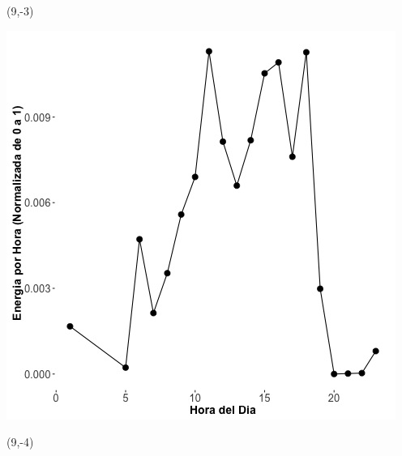 \documentclass{article}\usepackage[]{graphicx}\usepackage[]{color}
\newenvironment{knitrout}{}{} %
\begin{document}
 \begin{textblock}{1}(9,-3)
\begin{minipage}{20em}
\begingroup

\endgroup
\end{minipage}
\end{textblock}

 \vspace{2cm}

\begin{knitrout}
\color{fgcolor}
\includegraphics[scale=0.75]{figure/A25_fplot_norm_median} 
\end{knitrout}


 \begin{textblock}{1}(9,-4)
\begin{minipage}{20em}
\begingroup

\endgroup
\end{minipage}
\end{textblock}

 \vspace{2cm}
\end{document}
